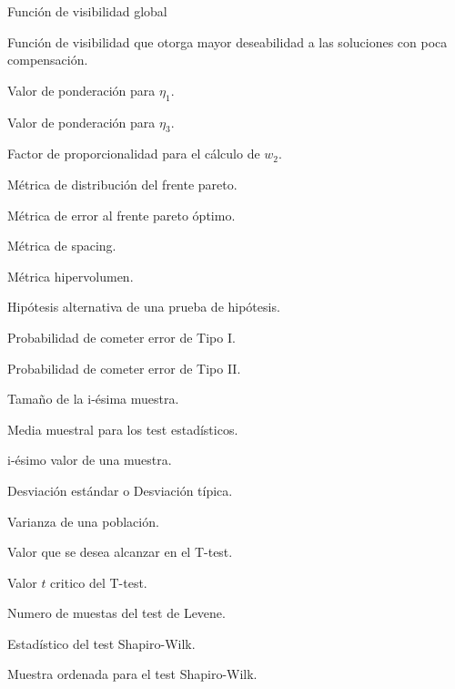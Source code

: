 \item[$\eta        $] Funci\'on de visibilidad global%
\item[$\eta_1        $] Funci\'on de visibilidad que otorga mayor deseabilidad a las soluciones con poca compensaci\'on.%
\item[$w_1        $] Valor de ponderaci\'on para $\eta_1$.%
\item[$w_3        $] Valor de ponderaci\'on para $\eta_3$.%
\item[$f_b        $] Factor de proporcionalidad para el c\'alculo de $w_2$.%
\item[$M_2        $] M\'etrica de distribuci\'on del frente pareto.%
\item[$M_4        $] M\'etrica de error al frente pareto \'optimo.%
\item[$SP        $] M\'etrica de spacing.%
\item[$HV        $] M\'etrica hipervolumen.%
\item[$H_1        $] Hip\'otesis alternativa de una prueba de hip\'otesis.%
\item[$\alpha-error        $] Probabilidad de cometer error de Tipo I.%
\item[$\beta-error        $] Probabilidad de cometer error de Tipo II.%
\item[$n_i        $] Tama\~no de la i-\'esima muestra.%
\item[$\bar{x}        $] Media muestral para los test estad\'isticos. %
\item[${x(i)}        $] i-\'esimo valor de una muestra. %
\item[$\sigma        $] Desviaci\'on est\'andar o Desviaci\'on t\'ipica.%
\item[$\sigma^2        $] Varianza de una poblaci\'on.%
\item[$\mu        $] Valor que se desea alcanzar en el T-test.%
\item[$t_c        $] Valor $t$ critico del T-test.%
\item[$d        $] Numero de muestas del test de Levene.%
\item[$W,p        $] Estad\'istico del test Shapiro-Wilk.%
\item[$Y_{(n)}        $] Muestra ordenada para el test Shapiro-Wilk.%

